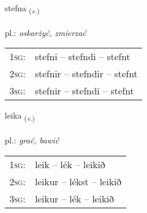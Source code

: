 \documentclass[frontgrid, backgrid]{flacards}\usepackage[]{graphicx}\usepackage[]{xcolor}
\begin{document}
\renewcommand{\flhead}{\vskip5pt \fboxsep=0pt {\small\bfseries\footnotesize Sagnorð | czasownik}}
\renewcommand{\fcfoot}{\vskip5pt \fboxsep=0pt \hspace{2pt}{\small\bfseries\footnotesize 1K}}

\renewcommand{\blhead}{\vskip5pt {\small\bfseries\footnotesize Sagnorð | czasownik }}
\renewcommand{\bcfoot}{\vskip5pt \hspace{2pt}{\small\bfseries\footnotesize 1K}}


{stefna \small{\textsubscript{(\textit{v.})}} \\[1ex] %
\textphonetic{[stɛpna]} \\
pl.: \emph{oskarżyć, zmierzać} \\  [2ex]
\renewcommand*{\arraystretch}{0.8}
\begin{tabular}{p{1cm}l}
\textsc{1sg}: & stefni -- stefndi -- stefnt \\ 
\textsc{2sg}: & stefnir -- stefndir -- stefnt \\ 
\textsc{3sg}: & stefnir -- stefndi -- stefnt \\ 
\end{tabular}
}

\renewcommand{\flhead}{\vskip5pt \fboxsep=0pt {\small\bfseries\footnotesize Sagnorð | czasownik}}
\renewcommand{\fcfoot}{\vskip5pt \fboxsep=0pt \hspace{2pt}{\small\bfseries\footnotesize 1K}}

\renewcommand{\blhead}{\vskip5pt {\small\bfseries\footnotesize Sagnorð | czasownik }}
\renewcommand{\bcfoot}{\vskip5pt \hspace{2pt}{\small\bfseries\footnotesize 1K}}


{leika \small{\textsubscript{(\textit{v.})}} \\[1ex] %
\textphonetic{[leiːka]} \\
pl.: \emph{grać, bawić} \\  [2ex]
\renewcommand*{\arraystretch}{0.8}
\begin{tabular}{p{1cm}l}
\textsc{1sg}: & leik -- lék -- leikið \\ 
\textsc{2sg}: & leikur -- lékst -- leikið \\ 
\textsc{3sg}: & leikur -- lék -- leikið \\ 
\end{tabular}
}
\end{document}
